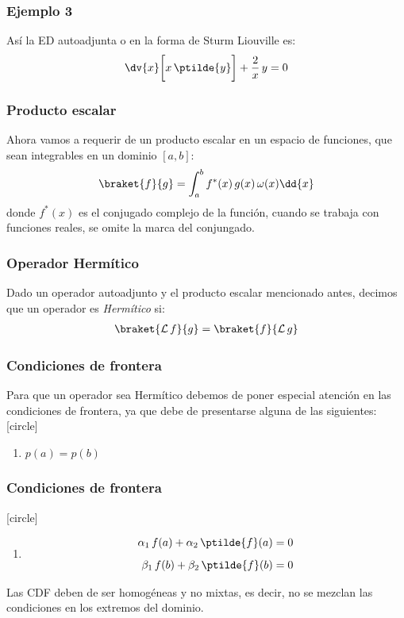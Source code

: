 \begin{frame}
\frametitle{Ejemplo 3}
Así la ED autoadjunta o en la forma de Sturm Liouville es:
\begin{align*}
\dv{x} \bigg[ x \, \ptilde{y} \bigg] + \dfrac{2}{x} \, y = 0
\end{align*}
\end{frame}
\begin{frame}
\frametitle{Producto escalar}
Ahora vamos a requerir de un producto escalar en un espacio de funciones, que sean integrables en un dominio $[a ,b]$:
\begin{align*}
\braket{f}{g} = \int_{a}^{b} f^{*}(x) \, g(x) \, \omega(x) \dd{x}
\end{align*}
donde $f^{*}(x)$ es el conjugado complejo de la función, cuando se trabaja con funciones reales, se omite la marca del conjungado.
\end{frame}
\begin{frame}
\frametitle{Operador Hermítico}
Dado un operador autoadjunto y el producto escalar mencionado antes, decimos que un operador es \emph{Hermítico} si:
\begin{align*}
\braket{\mathcal{L} \, f}{g} = \braket{f}{\mathcal{L} \, g}
\end{align*}
\end{frame}
\begin{frame}
\frametitle{Condiciones de frontera}
Para que un operador sea Hermítico debemos de poner especial atención en las condiciones de frontera, ya que debe de presentarse alguna de las siguientes:
[circle]
\begin{enumerate}[<+->]
\item $p(a) = p(b)$
\seti
\end{enumerate}
\end{frame}
\begin{frame}
\frametitle{Condiciones de frontera}
[circle]
\begin{enumerate}[<+->]
\conti
\item 
\begin{align*}
\alpha_{1} \, f(a) + \alpha_{2} \, \ptilde{f} (a) &= 0 \\[0.5em]
\beta_{1} \, f(b) + \beta_{2} \, \ptilde{f} (b) &= 0
\end{align*}
\seti
\end{enumerate}
Las CDF deben de ser homogéneas y no mixtas, es decir, no se mezclan las condiciones en los extremos del dominio.
\end{frame}

